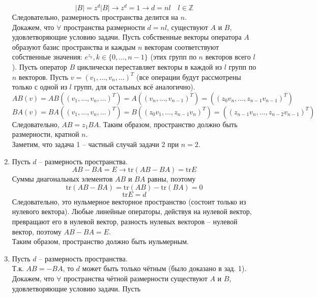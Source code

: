 \documentclass[12pt]{article}
\begin{document}
\begin{enumerate}
\begin{equation}
        |B|=z^d|B|\rightarrow z^d=1\rightarrow d=nl\quad l\in\mathbb{Z}
    \end{equation}
    Следовательно, размерность пространства делится на $n$.\\
    Докажем, что $\forall$ пространства размерности $d=nl$, существуют $A$ и $B$, удовлетворяющие условию задачи. Пусть собственные векторы оператора $A$ образуют базис пространства и каждым $n$ векторам соответствуют собственные значения: $e^{z_k}, k\in\{0,...,n-1\}$ (этих групп по $n$ векторов всего $l$). Пусть оператор $B$ циклически переставляет векторы в каждой из $l$ групп по $n$ векторов. Пусть $v=(v_1,...,v_{n},...)^T$ (все операции будут рассмотрены только с одной из $l$ групп, для остальных всё аналогично).
    \begin{equation}
        AB(v)=AB((v_1,...,v_{n},...)^T)=A((v_n,...,v_{n-1})^T)=((z_0 v_n,...,z_{n-1} v_{n-1})^T)
    \end{equation}
    \begin{equation}
        BA(v)=BA((v_1,...,v_{n},...)^T)=B((z_0v_1,...,z_{n-1}v_n)^T)=((z_{n-1} v_n,...,z_{n-2} v_{n-1})^T)
    \end{equation}
    Следовательно, $AB=z_1BA$. Таким образом, пространство должно быть размерности, кратной $n$.\\
    Заметим, что задача 1 -- частный случай задачи 2 при $n=2$.
\item Пусть $d$ -- размерность пространства.
\begin{equation}
    AB-BA=E\rightarrow \text{tr}(AB-BA)=\text{tr}E
\end{equation}
Суммы диагональных элементов $AB$ и $BA$ равны, поэтому
\begin{equation}
    \text{tr}(AB-BA)=\text{tr}(AB)-\text{tr}(BA)= 0
\end{equation}
\begin{equation}
    \text{tr}E=d
\end{equation}
Следовательно, это нульмерное векторное пространство (состоит только из нулевого вектора). Любые линейные операторы, действуя на нулевой вектор, превращают его в нулевой вектор, разность нулевых векторов -- нулевой вектор, поэтому $AB-BA=E$.\\
Таким образом, пространство должно быть нульмерным.
\item Пусть $d$ -- размерность пространства.\\
Т.к. $AB=-BA$, то $d$ может быть только чётным (было доказано в зад. 1).\\
Докажем, что $\forall$ пространства чётной размерности существуют $A$ и $B$, удовлетворяющие условию задачи. Пусть

\end{enumerate}
\end{document}
